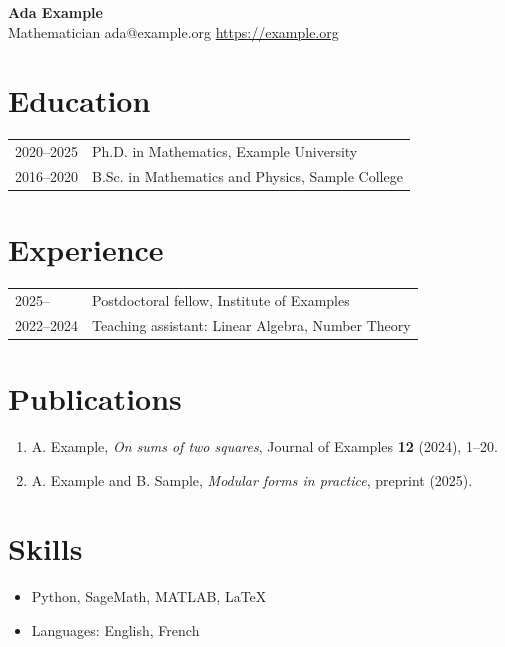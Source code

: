 \documentclass[11pt]{article}
\begin{document}
\begin{center}
  {\LARGE\textbf{Ada Example}}\\[4pt]
  Mathematician \quad\textbullet\quad ada@example.org \quad\textbullet\quad \url{https://example.org}
\end{center}

\section*{Education}
\begin{tabular}{@{}p{3cm}l@{}}
  2020--2025 & Ph.D. in Mathematics, Example University \\
  2016--2020 & B.Sc. in Mathematics and Physics, Sample College \\
\end{tabular}

\section*{Experience}
\begin{tabular}{@{}p{3cm}l@{}}
  2025-- & Postdoctoral fellow, Institute of Examples \\
  2022--2024 & Teaching assistant: Linear Algebra, Number Theory \\
\end{tabular}

\section*{Publications}
\begin{enumerate}
  \item A. Example, \emph{On sums of two squares}, Journal of Examples \textbf{12} (2024), 1--20.
  \item A. Example and B. Sample, \emph{Modular forms in practice}, preprint (2025).
\end{enumerate}

\section*{Skills}
\begin{itemize}
  \item Python, SageMath, MATLAB, \LaTeX
  \item Languages: English, French
\end{itemize}
\end{document}
